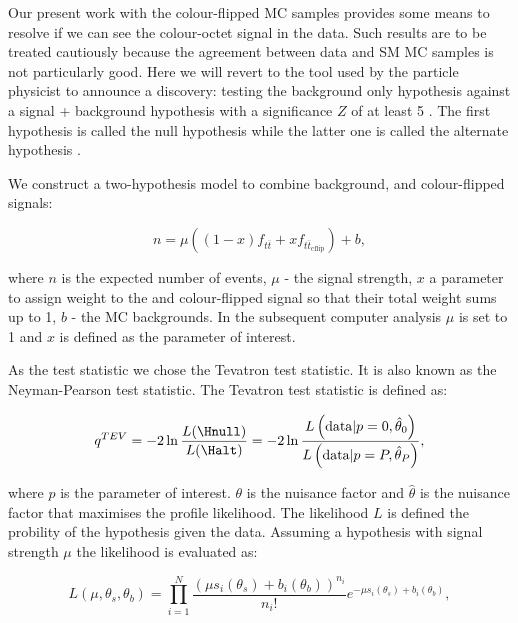 \label{subsec:hypo_testing}

Our present work with the colour-flipped MC samples provides some means to resolve if we can see the colour-octet \PW signal in the data. Such results are to be treated cautiously because the agreement between data and SM MC samples is not particularly good. Here we will revert to the tool used by the particle physicist to announce a discovery: testing the background only hypothesis against a signal + background hypothesis with a significance $Z$ of at least 5 \cite{Cowan:2010js}. The first hypothesis is called the null hypothesis \Hnull while the latter one is called the alternate hypothesis \Halt.

We construct a two-hypothesis model to combine background, \ttbar and colour-flipped \ttbar signals:

\begin{equation}
  n=\mu\left(\left(1-x\right)f_{t\overline{t}} + xf_{t\overline{t}_{\text{cflip}}}\right) + b,
  \label{eq:two_hypo_model}
\end{equation}

where $n$ is the expected number of events, $\mu$ - the signal strength, $x$ a parameter to assign weight to the \ttbar and colour-flipped \ttbar signal so that their total weight sums up to 1, $b$ - the MC backgrounds. In the subsequent computer analysis $\mu$ is set to 1 and $x$ is defined as the parameter of interest.

As the test statistic we chose the Tevatron test statistic. It is also known as the Neyman-Pearson test statistic. The Tevatron test statistic is defined as:

\begin{equation}
  q^{TEV}=-2\ln{\frac{L(\Hnull)}{L(\Halt)}}=-2\ln{\frac{L\left(\text{data}|p=0,\hat{\theta}_{0}\right)}{L\left(\text{data}|p=P,\hat{\theta}_{P}\right)}},
\end{equation}

where $p$ is the parameter of interest. $\theta$ is the nuisance factor and $\hat{\theta}$ is the nuisance factor that maximises the profile likelihood. The likelihood $L$ is defined the probility of the hypothesis given the data. Assuming a hypothesis with signal strength $\mu$ the likelihood is evaluated as:

\begin{equation}
  L(\mu, \theta_{s}, \theta_{b}) = \prod_{i=1}^{N}\frac{(\mu s_{i}(\theta_{s}) + b_{i}(\theta_{b}))^{n_{i}}}{n_{i}!}e^{-\mu s_{i}(\theta_{s}) + b_{i}(\theta_{b})},
\end{equation}

